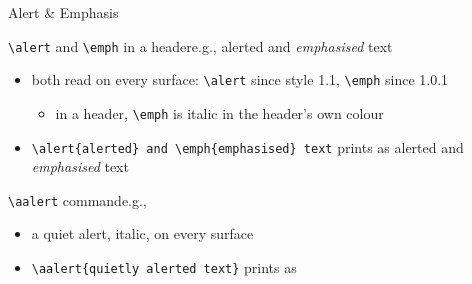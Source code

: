 \documentclass[presentation,cesena,apice]{beamer}\mode<presentation>{\usetheme{AMSCesena}}
\begin{document}
\begin{frame}[c,fragile]{Alert \& Emphasis}
%
\begin{block}{\texttt{\textbackslash{}alert} and \texttt{\textbackslash{}emph} in a header\textemdash{}e.g., \alert{alerted} and \emph{emphasised} text}
\begin{itemize}
	\item both read on every surface: \texttt{\textbackslash{}alert} since style 1.1, \texttt{\textbackslash{}emph} since 1.0.1
	\begin{itemize}
		\item in a header, \texttt{\textbackslash{}emph} is italic in the header's own colour
	\end{itemize}
	\item[e.g.] \verb|\alert{alerted} and \emph{emphasised} text| prints as \alert{alerted} and \emph{emphasised} text
\end{itemize}
\end{block}
%
\begin{block}{\texttt{\textbackslash{}aalert} command\textemdash{}e.g., }
\begin{itemize}
	\item a quiet alert, italic, on every surface
	\item[e.g.] \verb|| prints as \aalert{quietly alerted text}
\end{itemize}
\end{block}
%
\end{frame}
\end{document}
